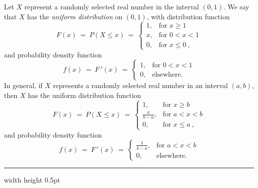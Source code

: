 \begin{exmp}\label{exmp:unifdistrib}
 Let $X$ represent a randomly selected real number in the interval $(0,1)$. We say that $X$ 
 has the \emph{uniform distribution} on $(0,1)$, with distribution function
  \begin{equation}
   F(x) ~=~ P(X \le x)
   ~=~ \begin{cases}
   1, &\text{for $x \ge 1$}\\
   x, &\text{for $0 < x < 1$}\\
   0, &\text{for $x \le 0~$,}
  \end{cases}
 \end{equation}
 and probability density function
 \begin{equation}
   f(x) ~=~ F\,'(x)
   ~=~ \begin{cases}
   1, &\text{for $0 < x < 1$}\\
   0, &\text{elsewhere.}
  \end{cases}
 \end{equation}
 In general, if $X$ represents a randomly selected real number in an interval $(a,b)$, then $X$ has the uniform
 distribution function
 \begin{equation}
   F(x) ~=~ P(X \le x)
   ~=~ \begin{cases}
   1, &\text{for $x \ge b$}\\
   \frac{x}{b-a}, &\text{for $a < x < b$}\\
   0, &\text{for $x \le a~$,}
  \end{cases}
 \end{equation}
 and probability density function
 \begin{equation}
   f(x) ~=~ F\,'(x)
   ~=~ \begin{cases}
   \frac{1}{b-a}, &\text{for $a < x < b$}\\
   0, &\text{elsewhere.}
  \end{cases}
 \end{equation}
\end{exmp}
\hrule width \textwidth height 0.5pt

